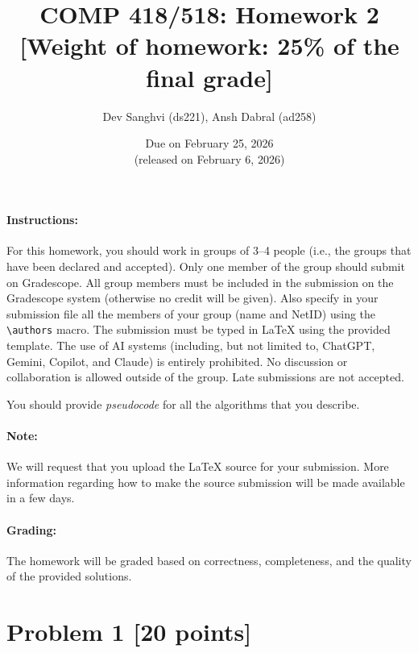 \documentclass[11pt]{article}
\begin{document}
\title{COMP 418/518: Homework 2 \\[1ex] \large [Weight of homework: 25\% of the final grade]}
\author{Dev Sanghvi (ds221), Ansh Dabral (ad258)}
\date{Due on February 25, 2026 \\ \small (released on February 6, 2026)}

\maketitle

\paragraph{Instructions:}

For this homework, you should work in groups of 3--4 people (i.e., the groups that have been declared and accepted).
%
Only one member of the group should submit on Gradescope.
%
All group members must be included in the submission on the Gradescope system (otherwise no credit will be given).
%
Also specify in your submission file all the members of your group (name and NetID) using the \texttt{\textbackslash authors} macro.
%
The submission must be typed in LaTeX using the provided template.
%
The use of AI systems (including, but not limited to, ChatGPT, Gemini, Copilot, and Claude) is entirely prohibited.
%
No discussion or collaboration is allowed outside of the group.
%
Late submissions are not accepted.

\begin{center}
You should provide \emph{pseudocode} for all the algorithms that you describe.
\end{center}

\paragraph{Note:}

We will request that you upload the LaTeX source for your submission. More information regarding how to make the source submission will be made available in a few days.

\paragraph{Grading:}

The homework will be graded based on correctness, completeness, and the quality of the provided solutions.

\newpage
\section*{Problem 1 [20 points]}
\end{document}
